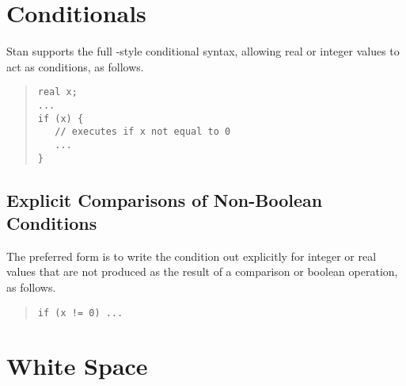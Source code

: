 \section{Conditionals}

Stan supports the full \Cpp-style conditional syntax,
allowing real or integer values to act as conditions, as follows.
%
\begin{quote}
\begin{Verbatim}[fontsize=\small]
real x;
...
if (x) {
   // executes if x not equal to 0
   ...
}
\end{Verbatim}
\end{quote}
%

\subsection{Explicit Comparisons of Non-Boolean Conditions}

The preferred form is to write the condition out explicitly for
integer or real values that are not produced as the result of a
comparison or boolean operation, as follows.
%
\begin{quote}
\begin{Verbatim}[fontsize=\small]
if (x != 0) ...
\end{Verbatim}
\end{quote}



\section{White Space}


